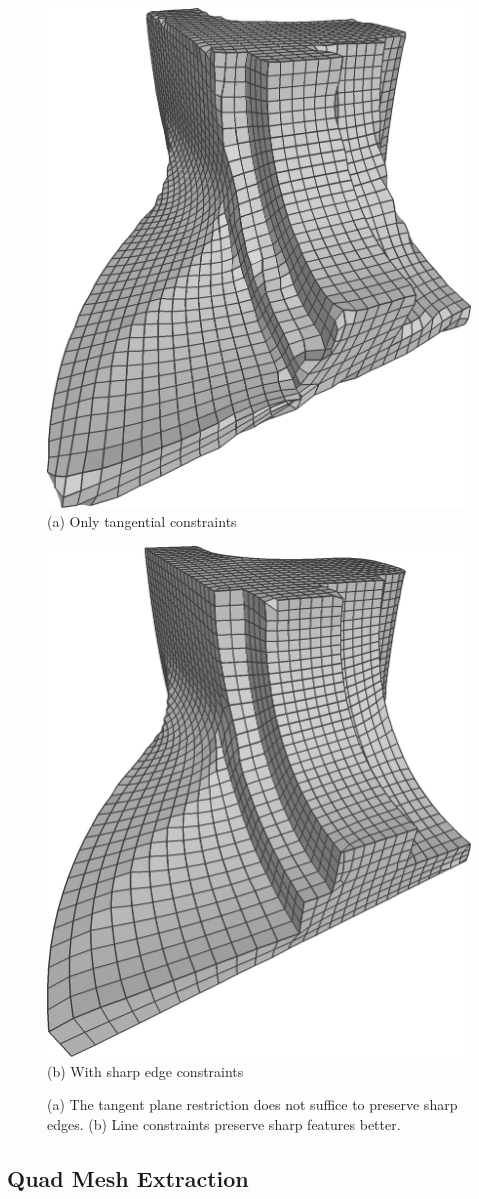 \begin{figure}
\centering
\begin{minipage}{0.45\linewidth}
\centering
\includegraphics[height=0.6\linewidth]{quadriflow/result/fandisk00.png}\\
(a) Only tangential constraints
\end{minipage}
\begin{minipage}{0.45\linewidth}
\centering
\includegraphics[height=0.6\linewidth]{quadriflow/result/fandisk01.png}\\
(b) With sharp edge constraints
\end{minipage}

\caption{(a) The tangent plane restriction does not suffice to preserve sharp edges. (b) Line constraints preserve sharp features better.}
\label{fig:quad-fandisk}
\end{figure}

\subsection{Quad Mesh Extraction}
\label{sec:quad-quadextraction}

